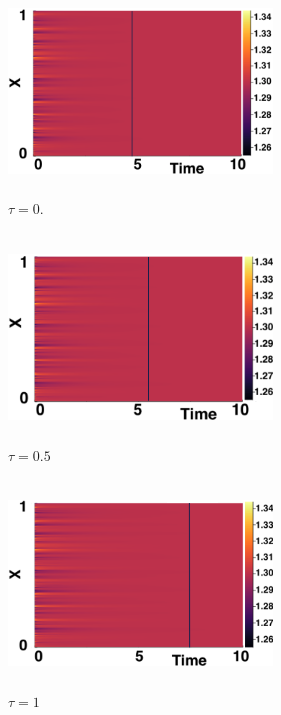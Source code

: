 \begin{figure}[H]
    \centering
    \begin{subfigure}[b]{0.45\textwidth}
        \centering
        \includegraphics[width=7cm,height=5.5cm]{decay1.png}
        \caption{$\tau=0$.}
        \label{}
    \end{subfigure}
    \hfill
    \begin{subfigure}[b]{0.45\textwidth}
        \centering
        \includegraphics[width=7cm,height=5.5cm]{decay2.png}
        \caption{$\tau=0.5$}
        \label{}
    \end{subfigure}
    \hfill
    \begin{subfigure}[b]{0.45\textwidth}
        \centering
        \includegraphics[width=7cm,height=5.5cm]{decay3.png}
        \caption{$\tau=1$}
        \label{}
    \end{subfigure}
    \hfill
    \begin{subfigure}[b]{0.45\textwidth}

\end{subfigure}
\end{figure}
